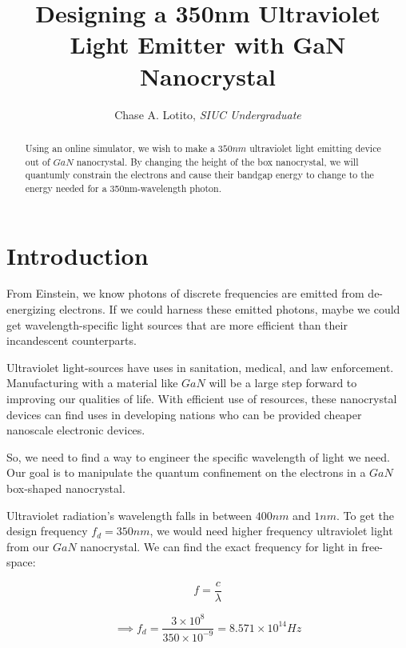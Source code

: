 \documentclass{IEEEtran}
\title{Designing a 350nm Ultraviolet Light Emitter with GaN Nanocrystal}
\author{Chase A. Lotito, \textit{SIUC Undergraduate}}
\date{}
\begin{document}
\maketitle %

\begin{abstract}

    Using an online simulator, we wish to make a \(350nm\) ultraviolet light emitting device out of \(GaN\) nanocrystal. By changing the height of the box nanocrystal, we will quantumly constrain the electrons and cause their bandgap energy to change to the energy needed for a 350nm-wavelength photon.   

\end{abstract}

\section{Introduction}

From Einstein, we know photons of discrete frequencies are emitted from de-energizing electrons. If we could harness these emitted photons, maybe we could get wavelength-specific light sources that are more efficient than their incandescent counterparts.

Ultraviolet light-sources have uses in sanitation, medical, and law enforcement. Manufacturing with a material like $GaN$ will be a large step forward to improving our qualities of life. With efficient use of resources, these nanocrystal devices can find uses in developing nations who can be provided cheaper nanoscale electronic devices.

So, we need to find a way to engineer the specific wavelength of light we need. Our goal is to manipulate the quantum confinement on the electrons in a \(GaN\) box-shaped nanocrystal.

Ultraviolet radiation's wavelength falls in between \(400nm\) and \(1nm\). To get the design frequency \(f_d = 350nm\), we would need higher frequency ultraviolet light from our \(GaN\) nanocrystal. We can find the exact frequency for light in free-space:

\begin{equation}
    f = \frac{c}{\lambda}
\end{equation}

\begin{equation*}
    \implies f_d = \frac{3 \times 10^8}{350 \times 10^{-9}} = 8.571 \times 10^{14} Hz
\end{equation*}
\end{document}
